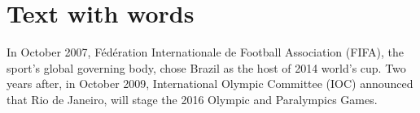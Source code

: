 \documentclass[a4paper,12pt]{article}
\begin{document}
\titleTMB 
\newpage
{} %

\section{Text with words}

In October 2007, Fédération Internationale de Football Association (FIFA), the
sport's global governing body, chose Brazil as the host of 2014 world's cup.
Two  years  after,  in  October  2009,  International  Olympic  Committee  (IOC)
announced  that Rio  de Janeiro,  will stage  the 2016  Olympic  and Paralympics
Games.
\end{document}

